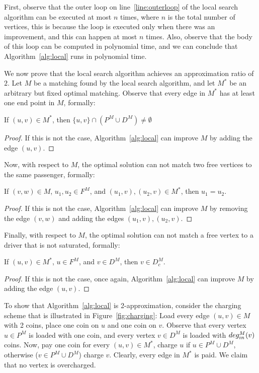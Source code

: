 First, observe that the outer loop on line~\ref{line:outerloop} of the local search algorithm
can be executed at most $n$ times, 
where $n$ is the total number of vertices, 
this is because the loop is executed only when there was an improvement, 
and this can happen at most $n$ times.
Also, observe that the body of this loop can be computed in polynomial time, 
and we can conclude that Algorithm~\ref{alg:local} runs in polynomial time.
    
We now prove that the local search algorithm achieves an approximation ratio of $2$.
Let $M$ be a matching found by the local search algorithm, 
and let $M^*$ be an arbitrary but fixed optimal matching.
Observe that every edge in $M^*$ has at least one end point in $M$, formally: 
\begin{lemma}
If $(u,v) \in M^*$, then $\{u,v\} \cap (P^M \cup D^M) \neq \emptyset$
\end{lemma}

\begin{proof}
If this is not the case, Algorithm~\ref{alg:local} can improve $M$
by adding the edge $(u,v)$.  
\end{proof}

Now, with respect to $M$, the optimal solution can not match two free vertices to the same
passenger, formally:
\begin{lemma}
\label{lemma:one-free}
If $(v,w) \in M$, $u_1, u_2 \in F^M$, and $(u_1, v), (u_2, v) \in M^*$, then $u_1 = u_2$.
\end{lemma}

\begin{proof}
If this is not the case, Algorithm~\ref{alg:local} can improve $M$ 
by removing the edge $(v,w)$ and adding the edges $(u_1, v), (u_2, v)$.
\end{proof}

Finally, with respect to $M$, the optimal solution can not match a free vertex to a driver
that is not saturated, formally: 
\begin{lemma}
\label{lemma:saturated}
If $(u,v) \in M^*$, $u \in F^M$, and $v \in D^M$, then $v \in D^M_c$.
\end{lemma}

\begin{proof}
If this is not the case, once again, Algorithm~\ref{alg:local} can improve $M$
by adding the edge $(u,v)$.
\end{proof}

To show that Algorithm~\ref{alg:local} is 2-approximation, 
consider the charging scheme that is illustrated in Figure~\ref{fig:charging}:
Load every edge $(u,v) \in M$ with 2 coins, 
place one coin on $u$ and one coin on $v$.
Observe that every vertex $u \in P^M$ is loaded with one coin, 
and every vertex $v \in D^M$ is loaded with $deg^M_{in}(v)$ coins.   
Now, pay one coin for every $(u,v) \in M^*$, charge $u$ if $u \in P^M \cup D^M$, 
otherwise ($v \in P^M \cup D^M$) charge $v$.
Clearly, every edge in $M^*$ is paid.
We claim that no vertex is overcharged.

